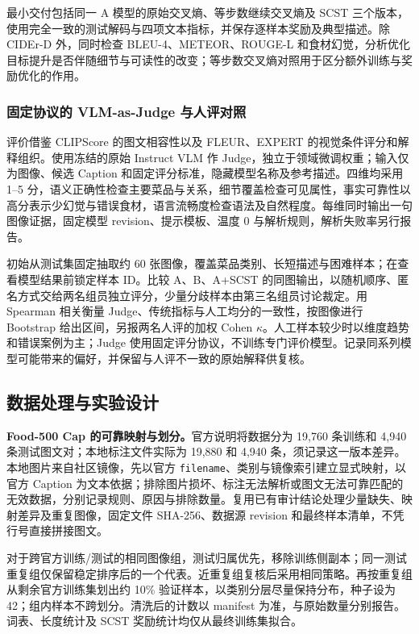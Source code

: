 最小交付包括同一 A 模型的原始交叉熵、等步数继续交叉熵及 SCST 三个版本，使用完全一致的测试解码与四项文本指标，并保存逐样本奖励及典型描述。除 CIDEr-D 外，同时检查 BLEU-4、METEOR、ROUGE-L 和食材幻觉，分析优化目标提升是否伴随细节与可读性的改变；等步数交叉熵对照用于区分额外训练与奖励优化的作用。

\subsubsection{固定协议的 VLM-as-Judge 与人评对照}
评价借鉴 CLIPScore 的图文相容性\cite{hessel2021clipscore}以及 FLEUR、EXPERT 的视觉条件评分和解释组织\cite{lee2024fleur,kim2025expert}。使用冻结的原始 Instruct VLM 作 Judge，独立于领域微调权重；输入仅为图像、候选 Caption 和固定评分标准，隐藏模型名称及参考描述。四维均采用 1--5 分，语义正确性检查主要菜品与关系，细节覆盖检查可见属性，事实可靠性以高分表示少幻觉与错误食材，语言流畅度检查语法及自然程度。每维同时输出一句图像证据，固定模型 revision、提示模板、温度 0 与解析规则，解析失败率另行报告。

初始从测试集固定抽取约 60 张图像，覆盖菜品类别、长短描述与困难样本；在查看模型结果前锁定样本 ID。比较 A、B、A+SCST 的同图输出，以随机顺序、匿名方式交给两名组员独立评分，少量分歧样本由第三名组员讨论裁定。用 Spearman 相关衡量 Judge、传统指标与人工均分的一致性，按图像进行 Bootstrap 给出区间，另报两名人评的加权 Cohen $\kappa$。人工样本较少时以维度趋势和错误案例为主；Judge 使用固定评分协议，不训练专门评价模型。记录同系列模型可能带来的偏好，并保留与人评不一致的原始解释供复核。


\FloatBarrier
\subsection{数据处理与实验设计}
\textbf{Food-500 Cap 的可靠映射与划分。}官方说明将数据分为 19,760 条训练和 4,940 条测试图文对\cite{ma2023food}；本地标注文件实际为 19,880 和 4,940 条，须记录这一版本差异。本地图片来自社区镜像，先以官方 \texttt{filename}、类别与镜像索引建立显式映射，以官方 Caption 为文本依据；排除图片损坏、标注无法解析或图文无法可靠匹配的无效数据，分别记录规则、原因与排除数量。复用已有审计结论处理少量缺失、映射差异及重复图像，固定文件 SHA-256、数据源 revision 和最终样本清单，不凭行号直接拼接图文。

对于跨官方训练/测试的相同图像组，测试归属优先，移除训练侧副本；同一测试重复组仅保留稳定排序后的一个代表。近重复组复核后采用相同策略。再按重复组从剩余官方训练集划出约 10\% 验证样本，以类别分层尽量保持分布，种子设为 42；组内样本不跨划分。清洗后的计数以 manifest 为准，与原始数量分别报告。词表、长度统计及 SCST 奖励统计均仅从最终训练集拟合。

